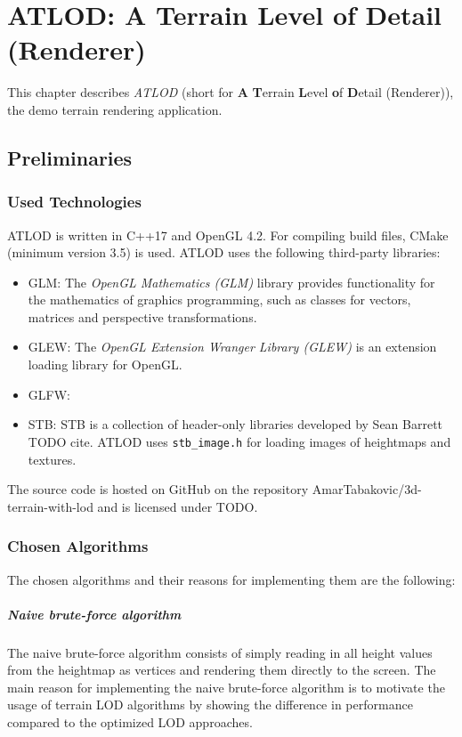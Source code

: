\chapter{ATLOD: A Terrain Level of Detail (Renderer)}
This chapter describes \textit{ATLOD} (short for \textbf{A} \textbf{T}errain \textbf{L}evel \textbf{o}f \textbf{D}etail (Renderer)), the demo terrain rendering application.

\section{Preliminaries}
\subsection{Used Technologies}
ATLOD is written in C++17 and OpenGL 4.2.
For compiling build files, CMake (minimum version 3.5) is used.
ATLOD uses the following third-party libraries:
\begin{itemize}
  \item GLM: The \textit{OpenGL Mathematics (GLM)} library provides functionality for the mathematics of graphics programming, such as classes for vectors, matrices and perspective transformations.
  \item GLEW: The \textit{OpenGL Extension Wranger Library (GLEW)} is an extension loading library for OpenGL. 
  \item GLFW: 
  \item STB: STB is a collection of header-only libraries developed by Sean Barrett TODO cite. ATLOD uses \texttt{stb\_image.h} for loading images of heightmaps and textures.
\end{itemize}

The source code is hosted on GitHub on the repository AmarTabakovic/3d-terrain-with-lod
and is licensed under TODO.

\subsection{Chosen Algorithms}
The chosen algorithms and their reasons for implementing them are the following:
\paragraph{Naive brute-force algorithm} The naive brute-force algorithm consists of simply reading in all height values from the heightmap as vertices and rendering them directly to the screen.
The main reason for implementing the naive brute-force algorithm is to motivate the usage of terrain LOD algorithms by showing the difference in performance
compared to the optimized LOD approaches.

